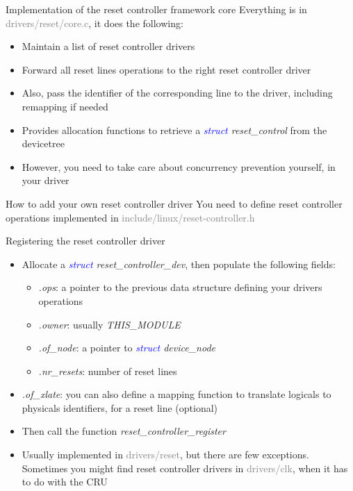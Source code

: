 \documentclass{beamer}
\begin{document}
\begin{frame}{Implementation of the reset controller framework core}
	Everything is in \textcolor{gray}{drivers/reset/core.c}, it does the following:
	\begin{itemize}
		\item Maintain a list of reset controller drivers
		\item Forward all reset lines operations to the right reset controller driver
		\item Also, pass the identifier of the corresponding line to the driver, including remapping if needed
		\item Provides allocation functions to retrieve a \textit{\textcolor{blue}{struct} reset\_control} from the devicetree
		\item However, you need to take care about concurrency prevention yourself, in your driver
	\end{itemize}
\end{frame}

\begin{frame}{How to add your own reset controller driver}
	You need to define reset controller operations implemented in \textcolor{gray}{include/linux/reset-controller.h}
	
\end{frame}


\begin{frame}{Registering the reset controller driver}
	\begin{itemize}
		\item Allocate a \textit{\textcolor{blue}{struct} reset\_controller\_dev}, then populate the following fields:
		\begin{itemize}
			\item \textit{.ops}: a pointer to the previous data structure defining your drivers operations
			\item \textit{.owner}: usually \textit{THIS\_MODULE}
			\item \textit{.of\_node}: a pointer to \textit{\textcolor{blue}{struct} device\_node}
			\item \textit{.nr\_resets}: number of reset lines
		\end{itemize}
		\item \textit{.of\_xlate}: you can also define a mapping function to translate logicals to physicals identifiers, for a reset line (optional)
		\item Then call the function \textit{reset\_controller\_register}
		\item Usually implemented in \textcolor{gray}{drivers/reset}, but there are few exceptions. Sometimes you might find reset controller drivers in \textcolor{gray}{drivers/clk}, when it has to do with the CRU
	\end{itemize}
\end{frame}
\end{document}
